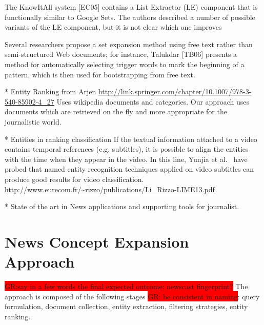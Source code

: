 \documentclass{llncs}
\newcommand{\todo}[1]{\colorbox{red}{#1}}
\begin{document}
The KnowItAll system [EC05] contains a List Extractor (LE) component that is functionally similar to Google Sets. The authors described a number of possible variants of the LE component, but it is not clear which one improves

Several researchers propose a set expansion method using free text rather than semi-structured Web documents; for instance, Talukdar [TB06] presents a method for automatically selecting trigger words to mark the beginning of a pattern, which is then used for bootstrapping from free text.


* Entity Ranking from Arjen
\url{http://link.springer.com/chapter/10.1007/978-3-540-85902-4_27}
Uses wikipedia documents and categories. Our approach uses documents which are retrieved on the fly and more appropriate for the journalistic world.

* Entities in ranking classification
If the textual information attached to a video contains temporal references (e.g. subtitles), it is possible to align the entities with the time when they appear in the video. In this line, Yunjia et al.~\cite{yunjia2013} have probed that named entity recognition techniques applied on video subtitles can produce good results for video classification.
\url{http://www.eurecom.fr/~rizzo/publications/Li_Rizzo-LIME13.pdf}

* State of the art in News applications and supporting tools for journalist.

\section{News Concept Expansion Approach}
\label{sec:ConceptExpansion}
\todo{GR:say in a few words the final expected outcome: newscast fingerprint?}
The approach is composed of the following stages \todo{GR: be consistent in naming}: query formulation, document collection, entity extraction, filtering strategies, entity ranking.
\end{document}
